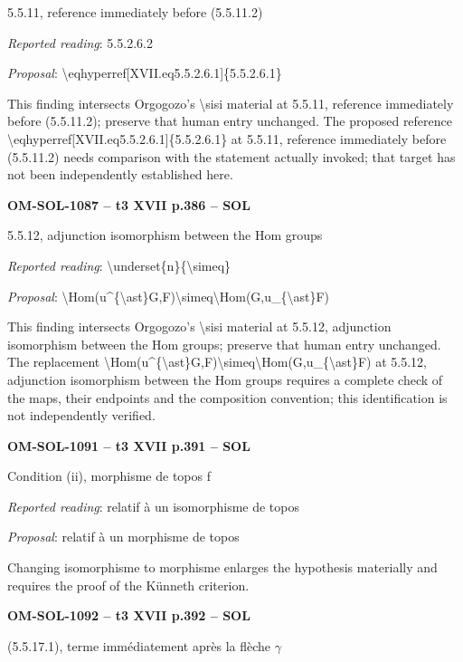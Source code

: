 5.5.11, reference immediately before (5.5.11.2)\par
\emph{Reported reading}: 5.5.2.6.2\par
\emph{Proposal}: \textbackslash{}eqhyperref[XVII.eq5.5.2.6.1]\{5.5.2.6.1\}\par
This finding intersects Orgogozo's \textbackslash{}sisi material at 5.5.11, reference immediately before (5.5.11.2); preserve that human entry unchanged. The proposed reference \textbackslash{}eqhyperref[XVII.eq5.5.2.6.1]\{5.5.2.6.1\} at 5.5.11, reference immediately before (5.5.11.2) needs comparison with the statement actually invoked; that target has not been independently established here.\par
\par\noindent\textbf{OM-SOL-1087 -- t3 XVII p.386 -- SOL}\par
5.5.12, adjunction isomorphism between the Hom groups\par
\emph{Reported reading}: \textbackslash{}underset\{n\}\{\textbackslash{}simeq\}\par
\emph{Proposal}: \textbackslash{}Hom(u\textasciicircum{}\{\textbackslash{}ast\}G,F)\textbackslash{}simeq\textbackslash{}Hom(G,u\_\{\textbackslash{}ast\}F)\par
This finding intersects Orgogozo's \textbackslash{}sisi material at 5.5.12, adjunction isomorphism between the Hom groups; preserve that human entry unchanged. The replacement \textbackslash{}Hom(u\textasciicircum{}\{\textbackslash{}ast\}G,F)\textbackslash{}simeq\textbackslash{}Hom(G,u\_\{\textbackslash{}ast\}F) at 5.5.12, adjunction isomorphism between the Hom groups requires a complete check of the maps, their endpoints and the composition convention; this identification is not independently verified.\par
\par\noindent\textbf{OM-SOL-1091 -- t3 XVII p.391 -- SOL}\par
Condition (ii), morphisme de topos f\par
\emph{Reported reading}: relatif à un isomorphisme de topos\par
\emph{Proposal}: relatif à un morphisme de topos\par
Changing isomorphisme to morphisme enlarges the hypothesis materially and requires the proof of the Künneth criterion.\par
\par\noindent\textbf{OM-SOL-1092 -- t3 XVII p.392 -- SOL}\par
(5.5.17.1), terme immédiatement après la flèche \ensuremath{\gamma}\par
